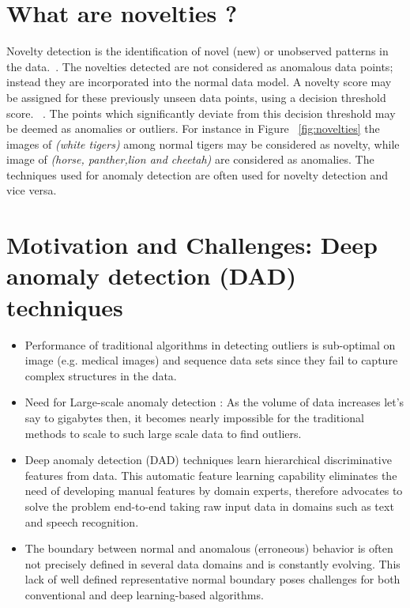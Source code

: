 \section{What are novelties ?}
Novelty detection is the identification of novel (new) or unobserved patterns in the data.~\cite{miljkovic2010review}. The novelties detected are not considered as anomalous data points; instead they are incorporated into the normal data model. A novelty score may be assigned for these previously unseen data points, using a decision threshold score. ~\cite{pimentel2014review}.  The points which significantly deviate from this decision threshold may be deemed as anomalies or outliers. For instance in Figure ~\ref{fig:novelties}  the images of \textit{(white tigers)} among normal tigers may be considered as novelty, while image of \textit{(horse, panther,lion and cheetah)} are considered as anomalies.
The techniques used for anomaly detection are often used for novelty detection and vice versa.



\section{Motivation and Challenges: Deep anomaly detection (DAD) techniques}
\begin{itemize}
\item Performance of traditional algorithms in detecting outliers is sub-optimal on  image (e.g. medical images) and sequence data sets since they fail to capture complex structures in the data.
\item  Need for Large-scale anomaly detection : As the volume of data increases let's say to gigabytes then, it becomes nearly impossible for the traditional methods to scale to such large scale data to find outliers.
\item  Deep anomaly detection (DAD) techniques learn hierarchical discriminative features from data. This automatic feature learning capability eliminates the need of developing manual features by domain experts, therefore advocates to solve the problem end-to-end taking raw input data in domains such as text and speech recognition.
\item The boundary between normal and anomalous (erroneous) behavior is often not precisely defined  in several data domains and is constantly evolving. This lack of well defined representative normal boundary poses challenges for both conventional and deep learning-based algorithms.
\end{itemize}

